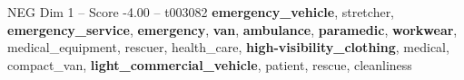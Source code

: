 \begin{textsample}{NEG Dim 1 – Score -4.00 – t003082}  \label{ex:f1_neg_020}
\textbf{emergency\_vehicle}, stretcher, \textbf{emergency\_service}, \textbf{emergency}, \textbf{van}, \textbf{ambulance}, \textbf{paramedic}, \textbf{workwear}, medical\_equipment, rescuer, health\_care, \textbf{high-visibility\_clothing}, medical, compact\_van, \textbf{light\_commercial\_vehicle}, patient, rescue, cleanliness

\end{textsample}
